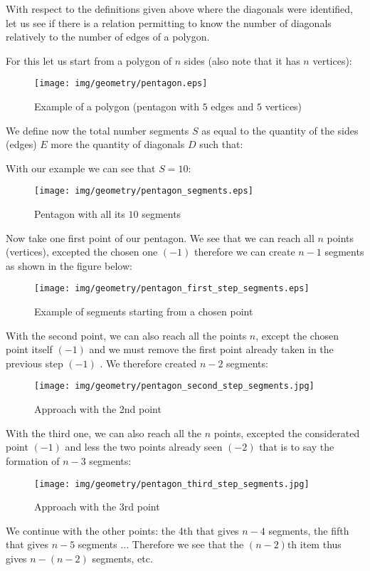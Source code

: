 {With respect to the definitions given above where the diagonals were identified, let us see if there is a relation permitting to know the number of diagonals relatively to the number of edges of a polygon.

For this let us start from a  polygon of $n$ sides (also note that it has $n$ vertices):

\begin{figure}[H]
\centering
\texttt{[image: img/geometry/pentagon.eps]}
\caption{Example of a polygon (pentagon with $5$ edges and $5$ vertices)}
\end{figure}

We define now the total number segments $S$ as equal to the quantity of the sides (edges) $E$ more the quantity of diagonals $D$ such that:
	
With our example we can see that $S=10$:

\begin{figure}[H]
\centering
\texttt{[image: img/geometry/pentagon\_segments.eps]}
\caption{Pentagon with all its $10$ segments}
\end{figure}

	Now take one first point of our pentagon. We see that we can reach all $n$ points (vertices), excepted the chosen one $(-1)$ therefore we can create $n-1$ segments as shown in the figure below:

	\begin{figure}[H]
	\centering
		\texttt{[image: img/geometry/pentagon\_first\_step\_segments.eps]}
	\caption{Example of segments starting from a chosen point}
	\end{figure}

	With the second point, we can also reach all the points $n$, except the chosen point itself $(-1)$ and we must remove the first point already taken in the previous step $(-1)$ . We therefore created $n-2$ segments:

	\begin{figure}[H]
	\centering
		\texttt{[image: img/geometry/pentagon\_second\_step\_segments.jpg]}
	\caption{Approach with the 2nd point}
	\end{figure}
	With the third one, we can also reach all the $n$ points, excepted the considerated point $(-1)$ and less the two points already seen $(-2)$ that is to say the formation of $n-3$ segments:
	\begin{figure}[H]
	\centering
		\texttt{[image: img/geometry/pentagon\_third\_step\_segments.jpg]}
	\caption{Approach with the 3rd point}
	\end{figure}
	We continue with the other points: the 4th that gives $n - 4$ segments, the fifth that gives $n - 5$ segments ... Therefore we see that the $(n - 2)\text{th}$ item thus gives $n - (n - 2 )$ segments, etc.
	
}
